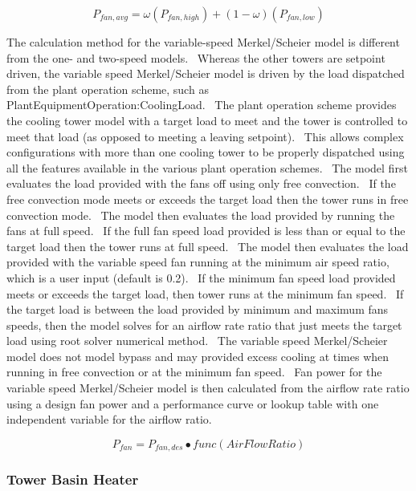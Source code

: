 \begin{equation}
{P_{fan,avg}} = \omega ({P_{fan,high}}) + \left( {1 - \omega } \right)\left( {{P_{fan,low}}} \right)
\end{equation}

The calculation method for the variable-speed Merkel/Scheier model is different from the one- and two-speed models.~ Whereas the other towers are setpoint driven, the variable speed Merkel/Scheier model is driven by the load dispatched from the plant operation scheme, such as PlantEquipmentOperation:CoolingLoad.~ The plant operation scheme provides the cooling tower model with a target load to meet and the tower is controlled to meet that load (as opposed to meeting a leaving setpoint).~ This allows complex configurations with more than one cooling tower to be properly dispatched using all the features available in the various plant operation schemes.~ The model first evaluates the load provided with the fans off using only free convection.~ If the free convection mode meets or exceeds the target load then the tower runs in free convection mode.~ The model then evaluates the load provided by running the fans at full speed.~ If the full fan speed load provided is less than or equal to the target load then the tower runs at full speed.~ The model then evaluates the load provided with the variable speed fan running at the minimum air speed ratio, which is a user input (default is 0.2).~ If the minimum fan speed load provided meets or exceeds the target load, then tower runs at the minimum fan speed.~ If the target load is between the load provided by minimum and maximum fans speeds, then the model solves for an airflow rate ratio that just meets the target load using root solver numerical method.~ The variable speed Merkel/Scheier model does not model bypass and may provided excess cooling at times when running in free convection or at the minimum fan speed.~ Fan power for the variable speed Merkel/Scheier model is then calculated from the airflow rate ratio using a design fan power and a performance curve or lookup table with one independent variable for the airflow ratio.

\begin{equation}
{P_{fan}} = {P_{fan,des}} \bullet func\left( {AirFlowRatio} \right)
\end{equation}

\subsubsection{Tower Basin Heater}\label{tower-basin-heater}

